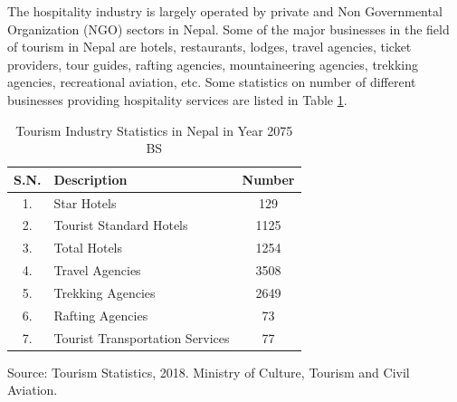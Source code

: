 \documentclass[12pt, a4paper, oneside]{article}
\begin{document}
The hospitality industry is largely operated by private and Non Governmental Organization (NGO) sectors in Nepal. Some of the major businesses in the field of tourism in Nepal are hotels, restaurants, lodges, travel agencies, ticket providers, tour guides, rafting agencies, mountaineering agencies, trekking agencies, recreational aviation, etc. Some statistics on number of different businesses providing hospitality services are listed in Table \ref{table:tourismindustry}.

\renewcommand{\arraystretch}{1.5}
\begin{table}[H]
\begin{tabularx}{\linewidth}{|c|X|c|}
\hline
\rowcolor[HTML]{C0C0C0} 
\textbf{S.N.}                & \textbf{Description} & \textbf{Number}   \\ \hline
1.  & Star Hotels     & 129                          \\ \hline
2.  & Tourist Standard Hotels    & 1125       \\ \hline
3.      & Total Hotels   & 1254          \\ \hline
4. & Travel Agencies    & 3508 \\ \hline
5. & Trekking Agencies & 2649            \\ \hline
6.  & Rafting Agencies    & 73          \\ \hline
7.      & Tourist Transportation Services  & 77      \\ \hline
\end{tabularx}
\footnotesize Source: Tourism Statistics, 2018. Ministry of Culture, Tourism and Civil Aviation. \cite{tourismstats}
\caption{Tourism Industry Statistics in Nepal in Year 2075 BS}
\label{table:tourismindustry}
\end{table}
\end{document}
